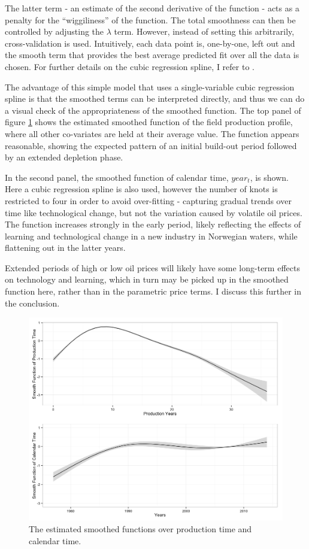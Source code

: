 \documentclass[11pt]{article}
\begin{document}
The latter term - an estimate of the second derivative of the function - acts as a penalty for the ``wiggiliness'' of the function. The total smoothness can then be controlled by adjusting the $\lambda$ term. However, instead of setting this arbitrarily, cross-validation is used. Intuitively, each data point is, one-by-one, left out and the smooth term that provides the best average predicted fit over all the data is chosen.  For further details on the cubic regression spline, I refer to \citet{wood_generalized_2006}.

The advantage of this simple model that uses a single-variable cubic regression spline is that the smoothed terms can be interpreted directly, and thus we can do a visual check of the appropriateness of the smoothed function. The top panel of figure \ref{smooths} shows the estimated smoothed function of the field production profile, where all other co-variates are held at their average value.  The function appears reasonable, showing the expected pattern of an initial build-out period followed by an extended depletion phase. 

In the second panel, the smoothed function of calendar time, $year_t$, is shown. Here a cubic regression spline is also used, however the number of knots is restricted to four in order to avoid over-fitting - capturing gradual trends over time like technological change, but not the variation caused by volatile oil prices. The function increases strongly in the early period, likely reflecting the effects of learning and technological change in a new industry in Norwegian waters, while flattening out in the latter years. 

Extended periods of high or low oil prices will likely have some long-term effects on technology and learning, which in turn may be picked up in the smoothed function here, rather than in the parametric price terms.  I discuss this further in the conclusion.  

\begin{figure}
	\includegraphics[width=1\textwidth]{figures/smooths.png}
	\caption{The estimated smoothed functions over production time and calendar time.}
	\label{smooths}
\end{figure}
\end{document}
